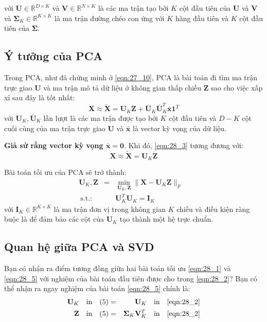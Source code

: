 với $\mathbf{U} \in \mathbb{R}^{D \times K}$ và $\mathbf{V}\in \mathbb{R}^{N\times K}$ là các ma trận tạo bởi $K$ cột đầu tiên của $\mathbf{U}$ và $\mathbf{V}$ và $\mathbf{\Sigma}_K \in \mathbb{R}^{K \times K}$ là ma trận đường chéo con ứng với $K$ hàng đầu tiên và $K$ cột đầu tiên của $\mathbf{\Sigma}$. 
 
 
\subsection{Ý tưởng của PCA}
Trong PCA, như đã chứng minh ở \eqref{eqn:27_10}, PCA là bài toán đi tìm ma trận trực giao $\mathbf{U}$ và ma trận mô tả dữ liệu ở không gian thấp chiều $\mathbf{Z}$ sao cho việc xấp xỉ sau đây là tốt nhất: 
\begin{equation} 
\label{eqn:28_3}
\mathbf{X} \approx \tilde{\mathbf{X}} = \mathbf{U}_K \mathbf{Z} + \bar{\mathbf{U}}_K \bar{\mathbf{U}}_K^T\bar{\mathbf{x}}\mathbf{1}^T 
\end{equation} 
với $\mathbf{U}_K, \bar{\mathbf{U}}_K$ lần lượt là các ma trận được tạo bởi $K$ cột đầu tiên và $D-K$ cột cuối cùng của ma trận trực giao $\mathbf{U}$ và $\bar{\mathbf{x}}$ là vector kỳ vọng của dữ liệu. 
 
\textbf{Giả sử rằng vector kỳ vọng $\bar{\mathbf{x}} = \mathbf{0}$}. Khi đó, \eqref{eqn:28_3} tương đương với: 
\begin{equation} 
\label{eqn:28_4}
\mathbf{X} \approx \tilde{\mathbf{X}} = \mathbf{U}_K \mathbf{Z}
\end{equation} 
 
Bài toán tối ưu của PCA sẽ trở thành: 
\begin{equation} 
\label{eqn:28_5}
\begin{aligned} 
  \mathbf{U}_K, \mathbf{Z} &=& \min_{\mathbf{U}_K, \mathbf{Z} } \|\mathbf{X} - \mathbf{U}_K \mathbf{Z}\|_F\\\ 
  \text{s.t.:}&& \mathbf{U}_K^T \mathbf{U}_K = \mathbf{I}_K & 
\end{aligned} 
\end{equation} 
với $\mathbf{I}_K \in \mathbb{R}^{K\times K}$ là ma trận đơn vị trong không gian $K$ chiều và điều kiện ràng buộc là để đảm bảo các cột của $\mathbf{U}_K$ tạo thành một hệ trực chuẩn. 
 
 
\subsection{Quan hệ giữa PCA và SVD}
Bạn có nhận ra điểm tương đồng giữa hai bài toán tối ưu \eqref{eqn:28_1} và \eqref{eqn:28_5} với nghiệm của bài toán đầu tiên được cho trong \eqref{eqn:28_2}? Bạn có thể nhận ra ngay nghiệm của bài toán \eqref{eqn:28_5} chính là: 
\begin{eqnarray} 
  \mathbf{U}_K \quad \text{in}\quad (5) &=& \mathbf{U}_K\quad \text{in} \quad \eqref{eqn:28_2} \\\ 
  \mathbf{Z} \quad\text{in}\quad (5) &=& \mathbf{\Sigma}_K \mathbf{V}_K^T \quad \text{in} \quad \eqref{eqn:28_2} 
\end{eqnarray} 
 
